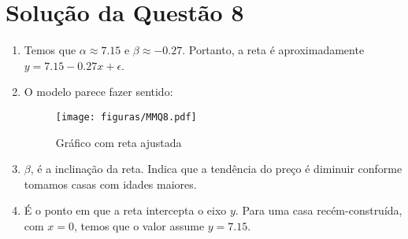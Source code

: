 \documentclass[
	12pt,				%
	openright,			%
	oneside,			%
	a4paper,			%
	english,			%
	brazil,				%
	]{abntex2}
\begin{document}
\section{Solução da Questão 8}

\begin{enumerate}[label=\alph*)]
    \item Temos que $\alpha \approx 7.15$ e $\beta \approx -0.27$. Portanto, a reta é aproximadamente $y = 7.15 - 0.27x + \epsilon$.
    \item O modelo parece fazer sentido:
    \begin{figure}[H]
        \centering
        \texttt{[image: figuras/MMQ8.pdf]}
        \caption{Gráfico com reta ajustada}
    \end{figure}
    \item $\beta$, é a inclinação da reta. Indica que a tendência do preço é diminuir conforme tomamos casas com idades maiores.
    \item É o ponto em que a reta intercepta o eixo $y$. Para uma casa recém-construída, com $x = 0$, temos que o valor assume $y = 7.15$.
\end{enumerate}
\end{document}
